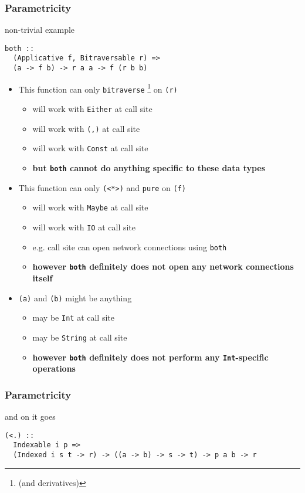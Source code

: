 \begin{frame}[fragile]
\frametitle{Parametricity}
\begin{block}{non-trivial example}
\begin{lstlisting}[style=haskell]
both ::
  (Applicative f, Bitraversable r) =>
  (a -> f b) -> r a a -> f (r b b)
\end{lstlisting}
\end{block}
\begin{itemize}
  \item<1-> This function can only \lstinline{bitraverse} \footnote{(and derivatives)} on \lstinline{(r)}
  \begin{itemize}
    \item will work with \lstinline{Either} at call site
    \item will work with \lstinline{(,)} at call site
    \item will work with \lstinline{Const} at call site
    \item \textbf{but \lstinline{both} cannot do anything specific to these data types}
  \end{itemize}
  \item<2-> This function can only \lstinline{(<*>)} and \lstinline{pure} on \lstinline{(f)}
  \begin{itemize}
    \item will work with \lstinline{Maybe} at call site
    \item will work with \lstinline{IO} at call site
    \item e.g. call site can open network connections using \lstinline{both}
    \item \textbf{however \lstinline{both} definitely does not open any network connections itself}
  \end{itemize}
  \item<3-> \lstinline{(a)} and \lstinline{(b)} might be anything
  \begin{itemize}
    \item may be \lstinline{Int} at call site
    \item may be \lstinline{String} at call site
    \item \textbf{however \lstinline{both} definitely does not perform any \lstinline{Int}-specific operations}
  \end{itemize}
\end{itemize}
\end{frame}

\begin{frame}[fragile]
\frametitle{Parametricity}
\begin{block}{and on it goes}
\begin{lstlisting}[style=haskell]
(<.) ::
  Indexable i p =>
  (Indexed i s t -> r) -> ((a -> b) -> s -> t) -> p a b -> r
\end{lstlisting}
\end{block}
\end{frame}
